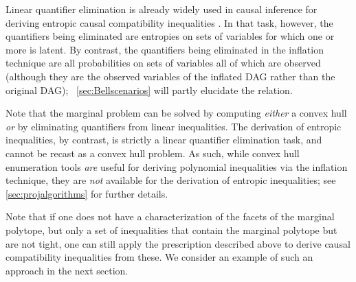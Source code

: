 %
%
Linear quantifier elimination is already widely used in causal inference for deriving entropic causal compatibility inequalities \cite{fritz2013marginal,chaves2014novel,chaves2014informationinference}. In that task, however, the quantifiers being eliminated are entropies on sets of variables for which one or more is latent. By contrast, the quantifiers being eliminated in the inflation technique are all probabilities on sets of variables all of which are observed (although they are the observed variables of the inflated DAG rather than the original DAG); 
~\cref{sec:Bellscenarios} will partly elucidate the relation.

Note that the marginal problem can be solved by computing \emph{either} a convex hull \emph{or} by eliminating quantifiers from linear inequalities. The derivation of entropic inequalities, by contrast, is strictly a linear quantifier elimination task, and cannot be recast as a convex hull problem. As such, while convex hull enumeration tools \emph{are} useful for deriving polynomial inequalities via the inflation technique, they are \emph{not} available for the derivation of entropic inequalities; see \cref{sec:projalgorithms} for further details.


Note that if one does not have a characterization of the facets of the marginal polytope, but only a set of inequalities that contain the marginal polytope but are not tight, one can still apply the prescription described above to derive causal compatibility inequalities from these.  We consider an example of such an approach in the next section.





